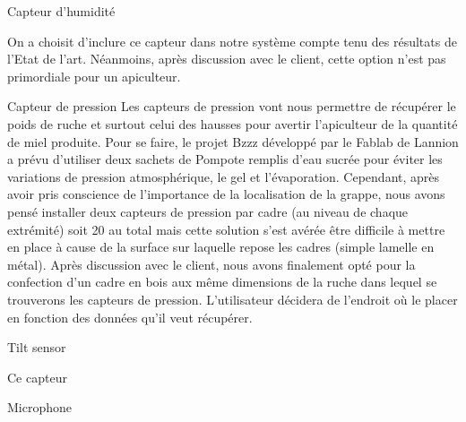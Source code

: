 Capteur d'humidité

On a choisit d'inclure ce capteur dans notre système compte tenu des résultats de l'Etat de l'art. Néanmoins, après discussion avec le client, cette option n'est pas primordiale pour un apiculteur.

Capteur de pression
Les capteurs de pression vont nous permettre de récupérer le poids de ruche et surtout celui des hausses pour avertir l'apiculteur de la quantité de miel produite. Pour se faire, le projet Bzzz développé par le Fablab de Lannion a prévu d'utiliser deux sachets de Pompote remplis d'eau sucrée pour éviter les variations de pression atmosphérique, le gel et l'évaporation. Cependant, après avoir pris conscience de l'importance de la localisation de la grappe, nous avons pensé installer deux capteurs de pression par cadre (au niveau de chaque extrémité) soit 20 au total mais cette solution s'est avérée être difficile à mettre en place à cause de la surface sur laquelle repose les cadres (simple lamelle en métal). Après discussion avec le client, nous avons finalement opté pour la confection d'un cadre en bois aux même dimensions de la ruche dans lequel se trouverons les capteurs de pression. L'utilisateur décidera de l'endroit où le placer en fonction des données qu'il veut récupérer.    

Tilt sensor 

Ce capteur

Microphone

 
  